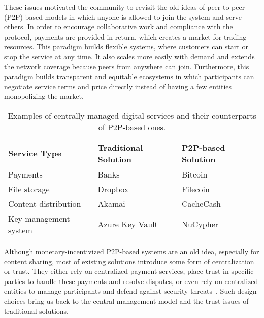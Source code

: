 \documentclass{llncs}
\begin{document}
These issues motivated the community to revisit the old ideas of peer-to-peer (P2P) based models in which anyone is allowed to join the system and serve others. In order to encourage collaborative work and compliance with the protocol, payments are provided in return, which creates a market for trading resources. This paradigm builds flexible systems, where customers can start or stop the service at any time. It also scales more easily with demand and extends the network coverage because peers from anywhere can join. Furthermore, this paradigm builds transparent and equitable ecosystems in which participants can negotiate service terms and price directly instead of having a few entities monopolizing the market.


\begin{table}[t!]
\caption{Examples of centrally-managed digital services and their counterparts of P2P-based ones.} 
\label{service-examples}
\centering 
\begin{tabular}{| p{}  | p{} | p{} |}\hline\hline

{\bf Service Type} & {\bf Traditional Solution} & {\bf P2P-based Solution}  \\[0.5ex] \hline \hline
 
Payments & Banks & Bitcoin  \\[0.5ex] \hline

File storage & Dropbox~\cite{dropbox} &  Filecoin~\cite{filecoin}  \\ [0.5ex]  \hline   

Content distribution & Akamai~\cite{akamai} & CacheCash~\cite{almashaqbeh2019cachecash}  \\ [0.5ex]  \hline
    
Key management system & Azure Key Vault~\cite{azure} & NuCypher~\cite{nucypher}  \\ [0.5ex]  \hline    

\end{tabular}
\end{table} 



Although monetary-incentivized P2P-based systems are an old idea, especially for content sharing, most of existing solutions introduce some form of centralization or trust. They either rely on centralized payment services, place trust in specific parties to handle these payments and resolve disputes, or even rely on centralized entities to manage participants and defend against security threats~\cite{Kassa13,Nair08,Zhang09}. Such design choices bring us back to the central management model and the trust issues of traditional solutions.
\end{document}
